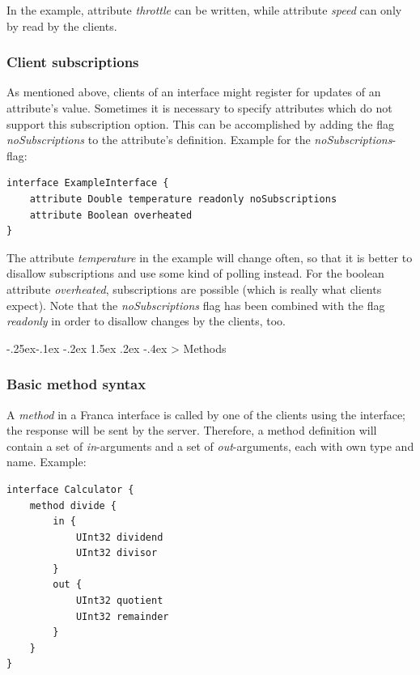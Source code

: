\documentclass[a4paper,10pt]{scrreprt}
\makeatletter
\renewcommand\subsection{\medskip\@startsection{subsection}{2}{\z@}%
  {-.25ex\@plus -.1ex \@minus -.2ex}%
  {1.5ex \@plus .2ex \@minus -.4ex}%
  {\ifnum \scr@compatibility>\@nameuse{scr@v@2.96}\relax
    \setlength{\parfillskip}{\z@ plus 1fil}\fi
    \raggedsection\normalfont\sectfont\nobreak\size@subsection
  }%
}
\makeatother
\begin{document}
  
In the example, attribute \textit{throttle} can be written, while attribute \textit{speed} can only
by read by the clients.

\subsubsection{Client subscriptions}
\label{FIDL_Interface_Attribute_NoSubscriptions}
As mentioned above, clients of an interface might register for updates of
an attribute's value. Sometimes it is necessary to specify attributes which do not
support this subscription option. This can be accomplished by adding the
flag \textit{noSubscriptions} to the attribute's definition.
Example for the \textit{noSubscriptions}-flag:


\begin{lstlisting}[language=Franca]
interface ExampleInterface {
	attribute Double temperature readonly noSubscriptions
	attribute Boolean overheated
}
\end{lstlisting}

The attribute \textit{temperature} in the example will change often, so that it is better
to disallow subscriptions and use some kind of polling instead. For the boolean
attribute \textit{overheated}, subscriptions are possible (which is really what clients
expect). Note that the \textit{noSubscriptions} flag has been combined with the flag
\textit{readonly} in order to disallow changes by the clients, too. 

\subsection{Methods}
\label{FIDL_Interface_Method}
\subsubsection{Basic method syntax}
\label{FIDL_Interface_Method_Basic}
A \textit{method} in a Franca interface is called by one of the clients using the interface;
the response will be sent by the server. Therefore, a method definition will contain 
a set of \textit{in}-arguments and a set of \textit{out}-arguments, each with own type and name.
Example:


\begin{lstlisting}[language=Franca]
interface Calculator {
	method divide {
		in {
			UInt32 dividend
			UInt32 divisor
		}
		out {
			UInt32 quotient
			UInt32 remainder
		}	
	}
}
\end{lstlisting}
\end{document}
